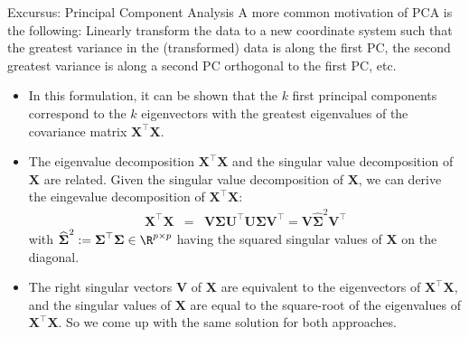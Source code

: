 \documentclass[11pt,compress,t,notes=noshow, xcolor=table]{beamer}
\begin{document}
\begin{vbframe}{Excursus: Principal Component Analysis}
A more common motivation of PCA is the following: Linearly transform the data to a new coordinate system such that the greatest variance in the (transformed) data is along the first PC, the second greatest variance is along a second PC orthogonal to the first PC, etc. 

\begin{itemize}
	\item In this formulation, it can be shown that the $k$ first principal components correspond to the $k$ eigenvectors with the greatest eigenvalues of the covariance matrix $\bm{X}^\top \bm{X}$. 
	\item The eigenvalue decomposition $\bm{X}^\top \bm{X}$ and the singular value decomposition of $\bm{X}$ are related. Given the singular value decomposition of $\bm{X}$, we can derive the eingevalue decomposition of $\bm{X}^\top \bm{X}$:  
	\begin{eqnarray*}
		\bm{X}^\top \bm{X} &=& \bm{V} \boldsymbol{\Sigma} \bm{U}^\top\bm{U} \boldsymbol{\Sigma} \bm{V}^\top = \bm{V} \boldsymbol{\widehat\Sigma}^2 \bm{V}^\top
	\end{eqnarray*}
	with $\boldsymbol{\widehat\Sigma}^2 := \boldsymbol{\Sigma}^\top \boldsymbol{\Sigma} \in \R^{p \times p}$ having the squared singular values of $\bm{X}$ on the diagonal.
	\item The right singular vectors $\bm{V}$ of $\bm{X}$ are equivalent to the eigenvectors of $\bm{X}^\top \bm{X}$, and the singular values of $\bm{X}$ are equal to the square-root of the eigenvalues of $\bm{X}^\top\bm{X}$. So we come up with the same solution for both approaches. 
\end{itemize}

\end{vbframe}


\endlecture
\end{document}
